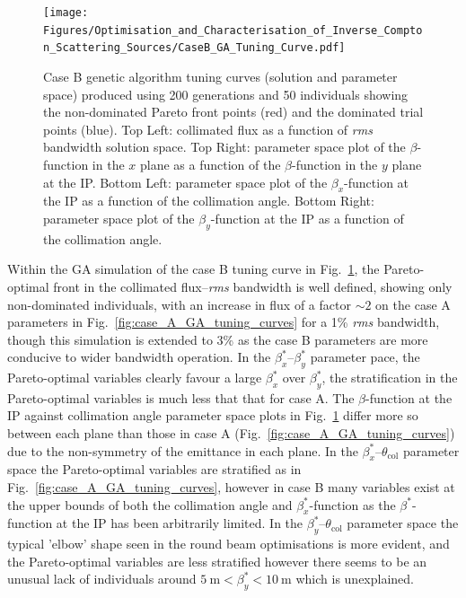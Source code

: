 \documentclass[../main.tex]{subfiles}
\begin{document}
\begin{figure}[!h]
\centering
\texttt{[image: Figures/Optimisation\_and\_Characterisation\_of\_Inverse\_Compton\_Scattering\_Sources/CaseB\_GA\_Tuning\_Curve.pdf]}
\caption{Case B genetic algorithm tuning curves (solution and parameter space) produced using 200 generations and 50 individuals showing the non-dominated Pareto front points (red) and the dominated trial points (blue). Top Left: collimated flux as a function of \textit{rms} bandwidth solution space. Top Right: parameter space plot of the $\beta$-function in the $x$ plane as a function of the $\beta$-function in the $y$ plane at the IP. Bottom Left: parameter space plot of the $\beta_{x}$-function at the IP as a function of the collimation angle. Bottom Right: parameter space plot of the $\beta_{y}$-function at the IP as a function of the collimation angle.}
\label{fig:case_B_GA_tuning_curves}
\end{figure}

Within the GA simulation of the case B tuning curve in Fig.~\ref{fig:case_B_GA_tuning_curves}, the Pareto-optimal front in the collimated flux--\textit{rms} bandwidth is well defined, showing only non-dominated individuals, with an increase in flux of a factor $\sim2$ on the case A parameters in Fig.~\ref{fig:case_A_GA_tuning_curves} for a 1\% \textit{rms} bandwidth, though this simulation is extended to 3\% as the case B parameters are more conducive to wider bandwidth operation. In the $\beta_{x}^{*}$--$\beta_{y}^{*}$ parameter pace, the Pareto-optimal variables clearly favour a large $\beta_{x}^{*}$ over $\beta_{y}^{*}$, the stratification in the Pareto-optimal variables is much less that that for case A. The $\beta$-function at the IP against collimation angle parameter space plots in Fig.~\ref{fig:case_B_GA_tuning_curves} differ more so between each plane than those in case A (Fig.~\ref{fig:case_A_GA_tuning_curves}) due to the non-symmetry of the emittance in each plane. In the $\beta_{x}^{*}$--$\theta_{\mathrm{col}}$ parameter space the Pareto-optimal variables are stratified as in Fig.~\ref{fig:case_A_GA_tuning_curves}, however in case B many variables exist at the upper bounds of both the collimation angle and $\beta_{x}^{*}$-function as the $\beta^{*}$-function at the IP has been arbitrarily limited. In the $\beta_{y}^{*}$--$\theta_{\mathrm{col}}$ parameter space the typical 'elbow' shape seen in the round beam optimisations is more evident, and the Pareto-optimal variables are less stratified however there seems to be an unusual lack of individuals around $5\mathrm{~\si{m}} < \beta_{y}^{*} < 10\mathrm{~\si{m}}$ which is unexplained.
\end{document}
